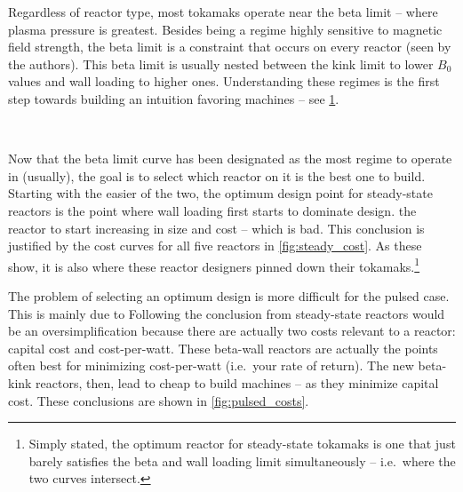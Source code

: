 Regardless of reactor type, most  tokamaks operate near the beta limit -- where plasma pressure is greatest. Besides being a regime highly sensitive to magnetic field strength, the beta limit is a constraint that occurs on every reactor (seen by the authors). This beta limit  is usually nested between the kink limit  to lower $B_0$ values and wall loading  to higher ones. Understanding these regimes is the first step towards building an intuition favoring  machines -- see \cref{fig:limit_regimes}.

\begin{figure}
\centering
\begin{adjustbox}{width=0.8\textwidth}
	
\end{adjustbox}
\caption{} ~ \\
\label{fig:limit_regimes}
\end{figure}

Now that the beta limit curve has been designated as the most  regime to operate in (usually), the goal is to select which reactor on it is the best one to build. Starting with the easier of the two, the optimum design point for steady-state reactors is the point where wall loading first starts to dominate  design.  the reactor to start increasing in size and cost -- which is bad. This conclusion is justified by the cost curves for all five reactors in \cref{fig:steady_cost}. As these show, it is also where these reactor designers pinned down their tokamaks.\footnote{ Simply stated, the optimum reactor for steady-state tokamaks is one that just barely satisfies the beta and wall loading limit simultaneously -- i.e.\ where the two curves intersect. }

The problem of selecting an optimum design is more difficult for the pulsed case. This is mainly due to  Following the conclusion from steady-state reactors would be an oversimplification because there are actually two costs relevant to a reactor: capital cost and cost-per-watt. These beta-wall reactors are actually the points often best for minimizing cost-per-watt (i.e.\ your rate of return). The new beta-kink reactors, then, lead to cheap to build machines -- as they minimize capital cost. These conclusions are shown in \cref{fig:pulsed_costs}.

